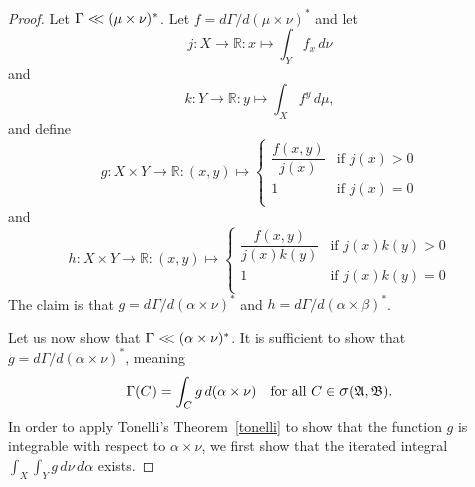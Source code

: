 \documentclass[
twoside=true,
paper=letter,
fontsize=9pt,
pagesize=auto,
leqno,
openany,
headsepline,
overfullrule,
]{scrbook}
\theoremstyle{plain}
\theoremstyle{plain}
\theoremstyle{definition}
\theoremstyle{bfnoteitalic}
\theoremstyle{bfnoteroman}
\newcommand{\sigalg}[1]{\mathfrak{#1}}
\newcommand{\sagb}{\mathop{\hbox{\large{$\sigma$}}}\nolimits}
\newcommand{\R}{\mathbb{R}}
\newcommand{\sigmaalgebra}{\sigalg{A}}
\newcommand{\sigmaalgebraii}{\sigalg{B}}
\newcommand{\productsig}[2]{\sagb(#1,#2)}
\newcommand{\funcg}{g}
\newcommand{\funcj}{j}
\newcommand{\funck}{k}
\newcommand{\function}{f}
\newcommand{\functionii}{g}
\newcommand{\functioniii}{h}
\newcommand{\measurespace}{X}
\newcommand{\measurespaceii}{Y}
\newcommand{\mspaceelt}{x}
\newcommand{\mspaceeltii}{y}
\newcommand{\abscont}{\mathrel{< \kern-3.5pt <}}
\newcommand{\measure}{\mu}
\newcommand{\measureii}{\nu}
\newcommand{\setiii}{C}
\newcommand{\measonprod}{\Gamma}%
\newcommand{\marginalone}{\alpha}%
\newcommand{\marginaltwo}{\beta}%
\begin{document}
\begin{proof}
Let
$\measonprod \abscont (\measure\times\measureii)^*$.
Let
$\function = d\measonprod / d(\measure\times\measureii)^*$
and let
\[
\funcj : \measurespace\to\R
: \mspaceelt \mapsto \int_\measurespaceii \function_\mspaceelt \, d\measureii
\]
and
\[
\funck : \measurespaceii\to\R
: \mspaceeltii \mapsto \int_\measurespace \function^\mspaceeltii \, d\measure,
\]
and define
\[
\functionii : \measurespace\times\measurespaceii \to \R
: (\mspaceelt,\mspaceeltii) \mapsto
\begin{cases}
\dfrac{\function(\mspaceelt,\mspaceeltii)}{\funcj(\mspaceelt)}
& \text{if $\funcj(\mspaceelt) > 0$} \\
1 
& \text{if $\funcj(\mspaceelt)=0$} \\
\end{cases}
\]
and
\[
\functioniii : \measurespace\times\measurespaceii \to \R
: (\mspaceelt,\mspaceeltii) \mapsto
\begin{cases}
\dfrac{\function(\mspaceelt,\mspaceeltii)} 
{\funcj(\mspaceelt)\funck(\mspaceeltii)}
& \text{if $\funcj(\mspaceelt)\funck(\mspaceeltii) > 0$} \\
1 
& \text{if $\funcj(\mspaceelt)\funck(\mspaceeltii)=0$} \\
\end{cases}
\]
The claim is that 
$\functionii
=
d\measonprod / d(\marginalone\times\measureii)^*$
and
$\functioniii
=
d\measonprod / d(\marginalone\times\marginaltwo)^*$.


Let us now show that 
$\measonprod \abscont (\marginalone\times\measureii)^*$.
It is sufficient to show that 
$\functionii
=
d\measonprod / d(\marginalone\times\measureii)^*$,
meaning
\[
\measonprod(\setiii)
=
\int_\setiii\functionii
\,d(\marginalone\times\measureii)
\quad
\text{for all $\setiii\in
\productsig{\sigmaalgebra}{\sigmaalgebraii}$}.
\]
In order to apply Tonelli's Theorem~\ref{tonelli} to show that the function $\functionii$ is integrable with respect to 
$\marginalone\times\measureii$, we first show that  the iterated integral
$\int_\measurespace\int_\measurespaceii \funcg \,d\measureii\,d\marginalone$
exists.


\end{proof}
\end{document}
